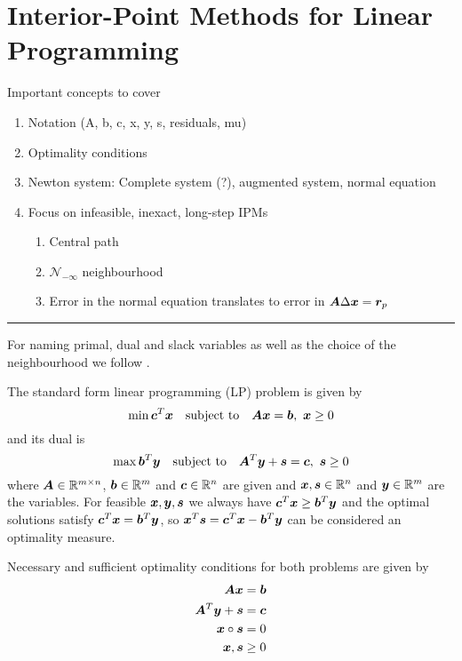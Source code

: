 \chapter{Interior-Point Methods for Linear Programming}

Important concepts to cover
\begin{enumerate}
 \item Notation (A, b, c, x, y, s, residuals, mu)
 \item Optimality conditions
 \item Newton system: Complete system (?), augmented system, normal equation
 \item Focus on infeasible, inexact, long-step IPMs
 \begin{enumerate}
   \item Central path
   \item \(\mathcal{N}_{-\infty}\) neighbourhood
   \item Error in the normal equation translates to error in \(\bm{A}\Delta\bm{x} = \bm{r}_p\)
 \end{enumerate}
\end{enumerate}

\hrule

For naming primal, dual and slack variables as well as the choice of the neighbourhood we follow \cite{Monteiro-ConvergenceAnalysisLongStepInfeasibleIPMs}.

The standard form linear programming (LP) problem is given by
\begin{equation}
 \min \bm{c}^T \bm{x} \quad \text{subject to} \quad \bm{A}\bm{x} = \bm{b}, \ \bm{x} \geq 0
\end{equation}
and its dual is
\begin{equation}
  \max \bm{b}^T \bm{y} \quad \text{subject to} \quad \bm{A}^T \bm{y} + \bm{s} = \bm{c}, \ \bm{s} \geq 0
\end{equation}
where \(\bm{A} \in \mathbb{R}^{m \times n}\), \(\bm{b} \in \mathbb{R}^m\) and \(\bm{c} \in \mathbb{R}^n\) are given and \(\bm{x}, \bm{s} \in \mathbb{R}^n\) and \(\bm{y} \in \mathbb{R}^m\) are the variables.
For feasible \(\bm{x}, \bm{y}, \bm{s}\) we always have \(\bm{c}^T \bm{x} \geq \bm{b}^T \bm{y}\) and the optimal solutions satisfy \(\bm{c}^T \bm{x} = \bm{b}^T \bm{y}\), so \(\bm{x}^T \bm{s} = \bm{c}^T \bm{x} - \bm{b}^T \bm{y}\) can be considered an optimality measure.

Necessary and sufficient optimality conditions for both problems are given by
\begin{subequations} \label{optimality-conditions}
  \begin{align}
    \bm{A} \bm{x} &= \bm{b} \label{primal-feasibility} \\
    \bm{A}^T \bm{y} + \bm{s} &= \bm{c} \label{dual-feasibility} \\
    \bm{x} \circ \bm{s} &= 0 \label{complementarity} \\
    \bm{x}, \bm{s} &\geq 0 \label{nonnegativity}
  \end{align}
\end{subequations}

